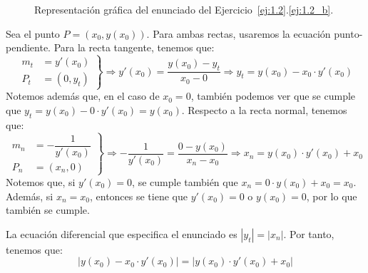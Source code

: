 \begin{ejercicio}
\begin{enumerate}
\begin{figure}
            \caption{Representación gráfica del enunciado del Ejercicio~\ref{ej:1.2}.\ref{ej:1.2_b}.}
            \label{fig:ej1.2_b}
        \end{figure}

        Sea el punto \(P=(x_0, y(x_0))\). Para ambas rectas, usaremos la ecuación punto-pendiente. Para la recta tangente, tenemos que:
        \begin{equation*}
            \left. \begin{aligned}
                m_t &= y'(x_0)\\
                P_t &= (0, y_t)
            \end{aligned} \right\} \Longrightarrow y'(x_0) = \dfrac{y(x_0) - y_t}{x_0 - 0}
            \Longrightarrow y_t = y(x_0) - x_0\cdot y'(x_0)
        \end{equation*}
        Notemos además que, en el caso de $x_0=0$, también podemos ver que se cumple que $y_t = y(x_0)-0\cdot y'(x_0) = y(x_0)$. Respecto a la recta normal, tenemos que:
        \begin{equation*}
            \left. \begin{aligned}
                m_n &= -\dfrac{1}{y'(x_0)}\\
                P_n &= (x_n, 0)
            \end{aligned} \right\} \Longrightarrow -\dfrac{1}{y'(x_0)} = \dfrac{0 - y(x_0)}{x_n - x_0}
            \Longrightarrow x_n = y(x_0)\cdot y'(x_0) + x_0
        \end{equation*}
        Notemos que, si $y'(x_0) = 0$, se cumple también que $x_n = 0\cdot y(x_0) + x_0 = x_0$. Además, si $x_n=x_0$, entonces se tiene que $y'(x_0) = 0$ o  $y(x_0)=0$, por lo que también se cumple.

        La ecuación diferencial que especifica el enunciado es $|y_t| = |x_n|$. Por tanto, tenemos que:
        \begin{equation*}
            \left| y(x_0) - x_0\cdot y'(x_0) \right| = \left| y(x_0)\cdot y'(x_0) + x_0 \right|
        \end{equation*}


\end{enumerate}
\end{ejercicio}
